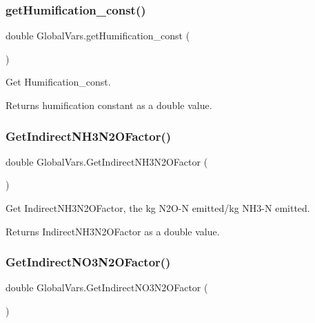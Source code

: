 \subsubsection{\texorpdfstring{getHumification\_const()}{getHumification\_const()}}
{\footnotesize\ttfamily double Global\+Vars.\+get\+Humification\+\_\+const (\begin{DoxyParamCaption}{ }\end{DoxyParamCaption})\hspace{0.3cm}{\ttfamily [inline]}}



Get Humification\+\_\+const. 

\begin{DoxyReturn}{Returns}
humification constant as a double value. 
\end{DoxyReturn}
\mbox{\label{class_global_vars_abd1cd815e0916bfe12a99d994b77a6d6}} 
\subsubsection{\texorpdfstring{GetIndirectNH3N2OFactor()}{GetIndirectNH3N2OFactor()}}
{\footnotesize\ttfamily double Global\+Vars.\+Get\+Indirect\+N\+H3\+N2\+O\+Factor (\begin{DoxyParamCaption}{ }\end{DoxyParamCaption})\hspace{0.3cm}{\ttfamily [inline]}}



Get Indirect\+N\+H3\+N2\+O\+Factor, the kg N2\+O-\/N emitted/kg N\+H3-\/N emitted. 

\begin{DoxyReturn}{Returns}
Indirect\+N\+H3\+N2\+O\+Factor as a double value. 
\end{DoxyReturn}
\mbox{\label{class_global_vars_a96a22d5ba43a69c0c1dd9b658e1117d4}} 
\subsubsection{\texorpdfstring{GetIndirectNO3N2OFactor()}{GetIndirectNO3N2OFactor()}}
{\footnotesize\ttfamily double Global\+Vars.\+Get\+Indirect\+N\+O3\+N2\+O\+Factor (\begin{DoxyParamCaption}{ }\end{DoxyParamCaption})\hspace{0.3cm}{\ttfamily [inline]}}



